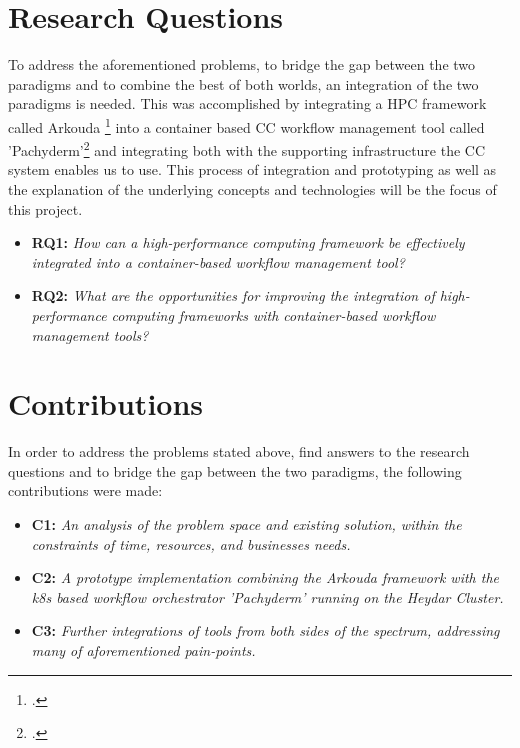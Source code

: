 \section{Research Questions}

To address the aforementioned problems, to bridge the gap between the two paradigms and to combine the best of both worlds, an integration of the two paradigms is needed.
This was accomplished by integrating a \ac{HPC} framework called Arkouda \footcite{merrillArkoudaInteractiveData2019} into a container based \ac{CC} workflow management tool called 'Pachyderm'\footcite{HomePage2022} and integrating both with the supporting infrastructure the \ac{CC} system enables us to use.
This process of integration and prototyping as well as the explanation of the underlying concepts and technologies will be the focus of this project.

\begin{itemize}
    \item \textbf{RQ1:} \textit{
        How can a high-performance computing framework be effectively integrated into a container-based workflow management tool?
    }
    \item \textbf{RQ2:} \textit{
        What are the opportunities for improving the integration of high-performance computing frameworks with container-based workflow management tools?
    }
\end{itemize}

\newpage
\section{Contributions}

In order to address the problems stated above, find answers to the research questions and to bridge the gap between the two paradigms, the following contributions were made:
\begin{itemize}
    \item \textbf{C1:} \textit{ An analysis of the problem space and existing solution, within the constraints of time, resources, and businesses needs.}
    \item \textbf{C2:} \textit{ A prototype implementation combining the Arkouda framework with the \ac{k8s} based workflow orchestrator 'Pachyderm' running on the Heydar Cluster.}
    \item \textbf{C3:} \textit{ Further integrations of tools from both sides of the spectrum, addressing many of aforementioned pain-points.}
\end{itemize}
